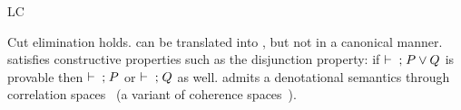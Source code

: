 \begin{entry}{LC}
\begin{technicalities}
Cut elimination holds.
\LK{} can be translated into \LC, but not in a canonical manner.
\LC{} satisfies constructive properties such as the disjunction property: if $\vdash{}\mathrel{;} P\vee Q$ is provable then $\vdash{}\mathrel{;} P$ or $\vdash{}\mathrel{;} Q$ as well.
\LC{} admits a denotational semantics through correlation spaces~\cite{lc} (a variant of coherence spaces~\cite{ll}).
\end{technicalities}



%
%
%
%
%
%
% 
%












\end{entry}



